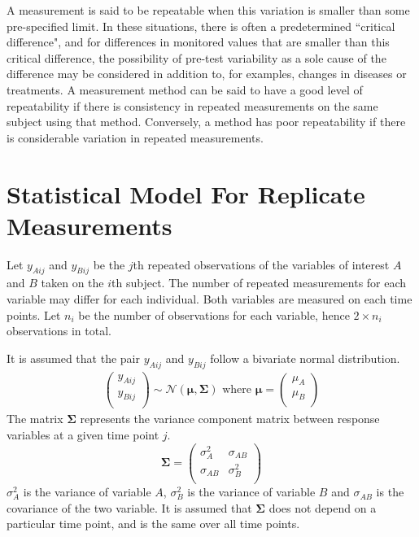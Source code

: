 \documentclass[12pt, a4paper]{report}
\theoremstyle{plain}
\theoremstyle{definition}
\theoremstyle{remark}
\begin{document}
	
	A measurement is said to be repeatable when this variation is smaller than some pre-specified limit. In these situations, there is often a predetermined ``critical difference", and for differences in monitored values that are smaller than this critical difference, the possibility of pre-test variability as a sole cause of the difference may be considered in addition to, for examples, changes in diseases or treatments. \bigskip
	A measurement method can be said to have a good level of repeatability if there is consistency in repeated measurements on the same subject using that method. Conversely, a method has poor repeatability if there is considerable variation in repeated measurements.	
	
	
	
	


		\section{Statistical Model For Replicate Measurements}
	Let $y_{Aij}$ and $y_{Bij}$ be the $j$th repeated observations of the variables of interest $A$ and $B$ taken on the $i$th subject. The number of repeated measurements for each variable may differ for each individual.
	Both variables are measured on each time points. Let $n_{i}$ be the number of observations for each variable, hence $2\times n_{i}$ observations in total.
	
	It is assumed that the pair $y_{Aij}$ and $y_{Bij}$ follow a bivariate normal distribution.
	\begin{eqnarray}
	\left(
	\begin{array}{c}
	y_{Aij} \\
	y_{Bij} \\
	\end{array}
	\right) \sim \mathcal{N}(
	\boldsymbol{\mu}, \boldsymbol{\Sigma})\mbox{   where } \boldsymbol{\mu} = \left(
	\begin{array}{c}
	\mu_{A} \\
	\mu_{B} \\
	\end{array}
	\right)
	\end{eqnarray}
	The matrix $\boldsymbol{\Sigma}$ represents the variance component matrix between response variables at a given time point $j$.
	\begin{equation}
	\boldsymbol{\Sigma} = \left( \begin{array}{cc}
	\sigma^2_{A} & \sigma_{AB} \\
	\sigma_{AB} & \sigma^2_{B}\\
	\end{array}\right)
	\end{equation}
	$\sigma^2_{A}$ is the variance of variable $A$, $\sigma^2_{B}$ is the variance of variable $B$ and $\sigma_{AB}$ is the covariance of the two variable. It is assumed that $\boldsymbol{\Sigma}$ does not depend on a particular time point, and is the same over all time points.
	
\end{document}
